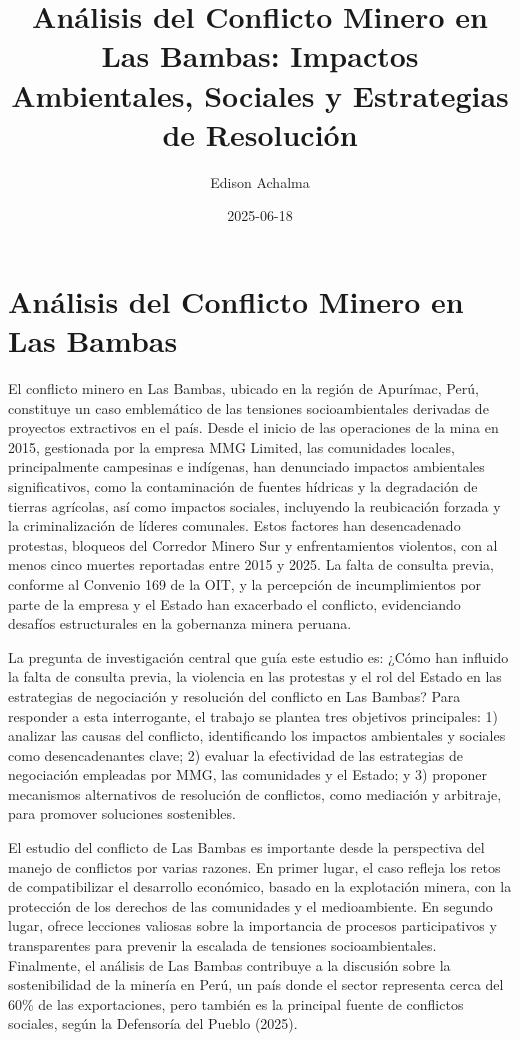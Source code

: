 \documentclass[
  stu,
  floatsintext,
  longtable,
  a4paper,
  nolmodern,
  notxfonts,
  notimes,
  colorlinks=true,linkcolor=blue,citecolor=blue,urlcolor=blue]{apa7}
\title{Análisis del Conflicto Minero en Las Bambas: Impactos
Ambientales, Sociales y Estrategias de Resolución}
\author{Edison Achalma}
\affiliation{
{Escuela Profesional de Economía, Universidad Nacional de San Cristóbal
de Huamanga}}
\date{2025-06-18}
\begin{document}
\maketitle

\hypertarget{toc}{}
\tableofcontents
\newpage
\section[Introduction]{Análisis del Conflicto Minero en Las Bambas}

\setcounter{secnumdepth}{5}

\setlength\LTleft{0pt}


El conflicto minero en Las Bambas, ubicado en la región de Apurímac,
Perú, constituye un caso emblemático de las tensiones socioambientales
derivadas de proyectos extractivos en el país. Desde el inicio de las
operaciones de la mina en 2015, gestionada por la empresa MMG Limited,
las comunidades locales, principalmente campesinas e indígenas, han
denunciado impactos ambientales significativos, como la contaminación de
fuentes hídricas y la degradación de tierras agrícolas, así como
impactos sociales, incluyendo la reubicación forzada y la
criminalización de líderes comunales. Estos factores han desencadenado
protestas, bloqueos del Corredor Minero Sur y enfrentamientos violentos,
con al menos cinco muertes reportadas entre 2015 y 2025. La falta de
consulta previa, conforme al Convenio 169 de la OIT, y la percepción de
incumplimientos por parte de la empresa y el Estado han exacerbado el
conflicto, evidenciando desafíos estructurales en la gobernanza minera
peruana.

La pregunta de investigación central que guía este estudio es: ¿Cómo han
influido la falta de consulta previa, la violencia en las protestas y el
rol del Estado en las estrategias de negociación y resolución del
conflicto en Las Bambas? Para responder a esta interrogante, el trabajo
se plantea tres objetivos principales: 1) analizar las causas del
conflicto, identificando los impactos ambientales y sociales como
desencadenantes clave; 2) evaluar la efectividad de las estrategias de
negociación empleadas por MMG, las comunidades y el Estado; y 3)
proponer mecanismos alternativos de resolución de conflictos, como
mediación y arbitraje, para promover soluciones sostenibles.

El estudio del conflicto de Las Bambas es importante desde la
perspectiva del manejo de conflictos por varias razones. En primer
lugar, el caso refleja los retos de compatibilizar el desarrollo
económico, basado en la explotación minera, con la protección de los
derechos de las comunidades y el medioambiente. En segundo lugar, ofrece
lecciones valiosas sobre la importancia de procesos participativos y
transparentes para prevenir la escalada de tensiones socioambientales.
Finalmente, el análisis de Las Bambas contribuye a la discusión sobre la
sostenibilidad de la minería en Perú, un país donde el sector representa
cerca del 60\% de las exportaciones, pero también es la principal fuente
de conflictos sociales, según la Defensoría del Pueblo (2025).
\end{document}
